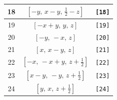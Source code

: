\documentclass[fleqn,8pt]{jsarticle}
\begin{document}
\begin{longtable}{ccc}
18 & $\left[ - y,\, x - y,\, \frac{1}{2} - z \right]$ & {\tt [18]} \\ \hline
19 & $\left[ - x + y,\, y,\, z \right]$ & {\tt [19]} \\ \hline
20 & $\left[ - y,\, - x,\, z \right]$ & {\tt [20]} \\ \hline
21 & $\left[ x,\, x - y,\, z \right]$ & {\tt [21]} \\ \hline
22 & $\left[ - x,\, - x + y,\, z + \frac{1}{2} \right]$ & {\tt [22]} \\ \hline
23 & $\left[ x - y,\, - y,\, z + \frac{1}{2} \right]$ & {\tt [23]} \\ \hline
24 & $\left[ y,\, x,\, z + \frac{1}{2} \right]$ & {\tt [24]} \\
\end{longtable}
\end{document}
